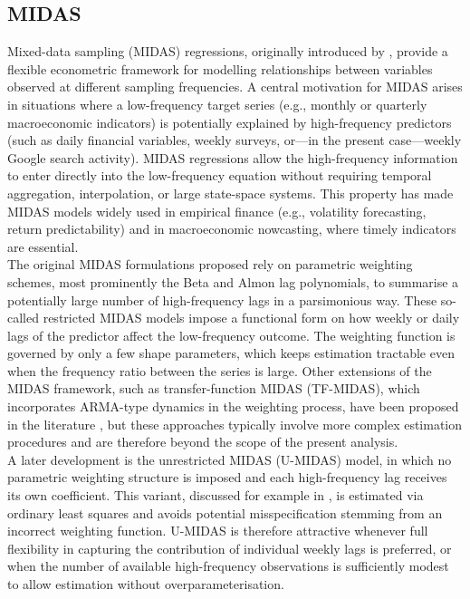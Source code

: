 \documentclass[12pt,a4paper]{article}
\begin{document}
\subsection{MIDAS}
Mixed-data sampling (MIDAS) regressions, originally introduced by \citet{ghysels,ghysel2}, provide a flexible econometric framework for modelling relationships between variables observed at different sampling frequencies. A central motivation for MIDAS arises in situations where a low-frequency target series (e.g., monthly or quarterly macroeconomic indicators) is potentially explained by high-frequency predictors (such as daily financial variables, weekly surveys, or—in the present case—weekly Google search activity). MIDAS regressions allow the high-frequency information to enter directly into the low-frequency equation without requiring temporal aggregation, interpolation, or large state-space systems. This property has made MIDAS models widely used in empirical finance (e.g., volatility forecasting, return predictability) and in macroeconomic nowcasting, where timely indicators are essential.\\
The original MIDAS formulations proposed rely on parametric weighting schemes, most prominently the Beta and Almon lag polynomials, to summarise a potentially large number of high-frequency lags in a parsimonious way. These so-called restricted MIDAS models impose a functional form on how weekly or daily lags of the predictor affect the low-frequency outcome. The weighting function is governed by only a few shape parameters, which keeps estimation tractable even when the frequency ratio between the series is large.
Other extensions of the MIDAS framework, such as transfer-function MIDAS (TF-MIDAS), which incorporates ARMA-type dynamics in the weighting process, have been proposed in the literature \citep{gayoso}, but these approaches typically involve more complex estimation procedures and are therefore beyond the scope of the present analysis.
\\
A later development is the unrestricted MIDAS (U-MIDAS) model, in which no parametric weighting structure is imposed and each high-frequency lag receives its own coefficient. This variant, discussed for example in \citet{COSTA2024101963}, is estimated via ordinary least squares and avoids potential misspecification stemming from an incorrect weighting function. U-MIDAS is therefore attractive whenever full flexibility in capturing the contribution of individual weekly lags is preferred, or when the number of available high-frequency observations is sufficiently modest to allow estimation without overparameterisation.\\
\end{document}
